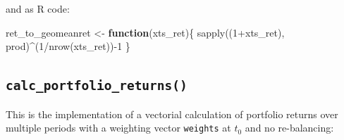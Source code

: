 \documentclass[
  oneside, a4paper, 12pt, openany]{book}
\newenvironment{Shaded}{\begin{snugshade}}{\end{snugshade}}
\newcommand{\ControlFlowTok}[1]{\textcolor[rgb]{0.13,0.29,0.53}{\textbf{#1}}}
\newcommand{\DecValTok}[1]{\textcolor[rgb]{0.00,0.00,0.81}{#1}}
\newcommand{\FunctionTok}[1]{\textcolor[rgb]{0.00,0.00,0.00}{#1}}
\newcommand{\NormalTok}[1]{#1}
\newcommand{\OtherTok}[1]{\textcolor[rgb]{0.56,0.35,0.01}{#1}}
\newcommand{\SpecialCharTok}[1]{\textcolor[rgb]{0.00,0.00,0.00}{#1}}
\theoremstyle{definition}
\theoremstyle{definition}
\theoremstyle{definition}
\theoremstyle{definition}
\theoremstyle{remark}
\begin{document}
and as R code:

\vspace{0.1cm}\fontsize{11}{12}\selectfont

\begin{Shaded}
\begin{Highlighting}[]
\NormalTok{ret\_to\_geomeanret }\OtherTok{\textless{}{-}} \ControlFlowTok{function}\NormalTok{(xts\_ret)\{}
  \FunctionTok{sapply}\NormalTok{((}\DecValTok{1}\SpecialCharTok{+}\NormalTok{xts\_ret), prod)}\SpecialCharTok{\^{}}\NormalTok{(}\DecValTok{1}\SpecialCharTok{/}\FunctionTok{nrow}\NormalTok{(xts\_ret))}\SpecialCharTok{{-}}\DecValTok{1}
\NormalTok{\}}
\end{Highlighting}
\end{Shaded}

\normalsize\vspace{0.1cm}

\hypertarget{calc_portfolio_returns}{%
\subsection{\texorpdfstring{\texttt{calc\_portfolio\_returns()}}{calc\_portfolio\_returns()}}\label{calc_portfolio_returns}}

This is the implementation of a vectorial calculation of portfolio returns over multiple periods with a weighting vector \texttt{weights} at \(t_0\) and no re-balancing:

\vspace{0.1cm}\fontsize{11}{12}\selectfont
\end{document}
